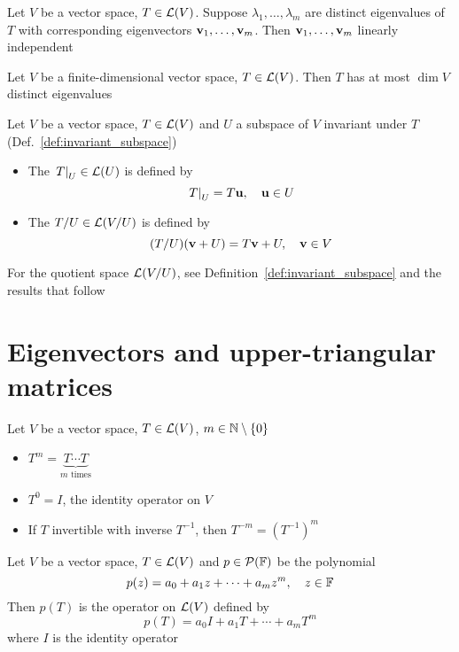 \documentclass[aspectratio=169]{beamer}
\begin{document}
\begin{frame}
\begin{importanttheorem}
Let $V$ be a vector space, $T\in\mathcal{L}(V)$. Suppose $\lambda_1,\ldots,\lambda_m$ are distinct eigenvalues of $T$ with corresponding eigenvectors $\mathbf{v}_1,\ldots,\mathbf{v}_m$. Then $\mathbf{v}_1,\ldots,\mathbf{v}_m$ linearly independent
\end{importanttheorem}
\vfill
\begin{importanttheorem}
Let $V$ be a finite-dimensional vector space, $T\in\mathcal{L}(V)$. Then $T$ has at most $\dim V$ distinct eigenvalues
\end{importanttheorem}
\end{frame}

\begin{frame}
\begin{definition}
\label{def:restriction_quotient_operators}
Let $V$ be a vector space, $T\in\mathcal{L}(V)$ and $U$ a subspace of $V$ invariant under $T$ (Def.~\ref{def:invariant_subspace})
\begin{itemize}
\item The  $\left.T\right|_{U}\in\mathcal{L}(U)$ is defined by
\[
\left.T\right|_{U}=T\mathbf{u},\quad \mathbf{u}\in U
\]
\item The  $T/U\in\mathcal{L}(V/U)$ is defined by
\[
(T/U)(\mathbf{v}+U)=T\mathbf{v}+U,\quad \mathbf{v}\in V
\]
\end{itemize}
\end{definition}
For the quotient space $\mathcal{L}(V/U)$, see Definition~\ref{def:invariant_subspace} and the results that follow
\end{frame}

\section{Eigenvectors and upper-triangular matrices}

\begin{frame}
\begin{definition}
Let $V$ be a vector space, $T\in\mathcal{L}(V)$, $m\in\mathbb{N}\setminus\{0\}$
\begin{itemize}
\item $T^m=\underbrace{T\cdots T}_{m\textrm{ times}}$
\item $T^0=I$, the identity operator on $V$
\item If $T$ invertible with inverse $T^{-1}$, then $T^{-m}=(T^{-1})^m$
\end{itemize}
\end{definition}
\vfill
\begin{definition}
Let $V$ be a vector space, $T\in\mathcal{L}(V)$ and $p\in\mathcal{P}(\mathbb{F})$ be the polynomial
\[
p(z)=a_0+a_1z+\cdots+a_mz^m,\quad z\in\mathbb{F}
\]
Then $p(T)$ is the operator on $\mathcal{L}(V)$ defined by
\[
p(T)=a_0I+a_1T+\cdots+a_mT^m
\]
where $I$ is the identity operator
\end{definition}
\end{frame}
\end{document}
